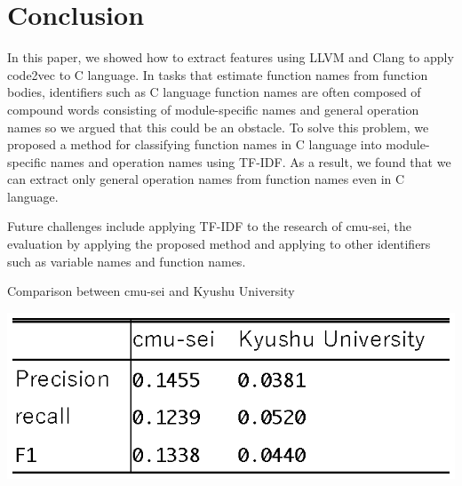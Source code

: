 \documentclass[JIP]{apris}
\begin{document}
\section{Conclusion}
In this paper, we showed how to extract features using LLVM and Clang to apply code2vec to C language.
In tasks that estimate function names from function bodies, identifiers such as C language function names are often composed of compound words consisting of module-specific names and general operation names so we argued that this could be an obstacle.
To solve this problem, we proposed a method for classifying function names in C language into module-specific names and operation names using TF-IDF.
As a result, we found that we can extract only general operation names from function names even in C language.

Future challenges include applying TF-IDF to the research of cmu-sei, the evaluation by applying the proposed method and applying to other identifiers such as variable names and function names.

\begin{table}[t]
 \centering
 \caption{Comparison between cmu-sei and Kyushu University}
 \includegraphics[width=1.0\hsize]{image/cmu-kyu.eps} 
 \label{table2} 
\end{table}






\end{document}
